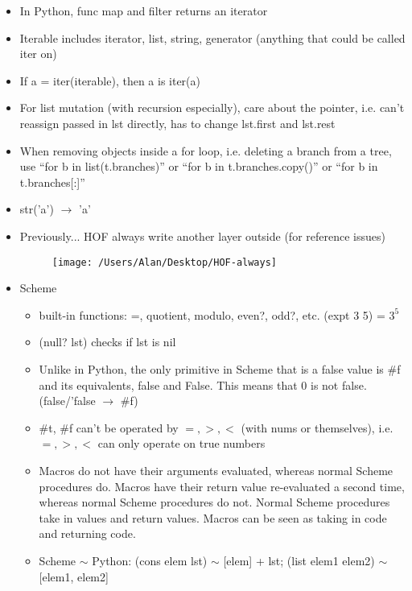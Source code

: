 \documentclass{article}
\begin{document}
\begin{itemize}
	\item In Python, func map and filter returns an {\color{red} iterator}
	\item Iterable includes iterator, list, string, generator (anything that could be called iter on)
	\item If a = iter(iterable), then a is iter(a)
	\item For list mutation (with recursion especially), care about the pointer, i.e. can't reassign passed in lst directly, has to change lst.first and lst.rest
	\item When removing objects inside a for loop, i.e. deleting a branch from a tree, use ``for b in list(t.branches)'' or ``for b in t.branches.copy()'' or ``for b in t.branches[:]''
	\item str('a') $\longrightarrow$ 'a'
	\item Previously... HOF always write another layer outside (for reference issues)
	\begin{figure} [h!]
	\begin{center}
		\texttt{[image: /Users/Alan/Desktop/HOF-always]}
		\label{fig}
	\end{center}
	\end{figure}
	\item Scheme
	\begin{itemize}
		\item built-in functions: =, quotient, modulo, even?, odd?, etc. (expt 3 5) = $3^5$
		\item (null? lst) checks if lst is nil
		\item Unlike in Python, the only primitive in Scheme that is a false value is \#f and its equivalents, false and False. This means that 0 is not false. (false/'false $\longrightarrow$ \#f)
		\item \#t, \#f can't be operated by $=, >, <$ (with nums or themselves), i.e. $=, >, <$ can only operate on true numbers
		\item Macros do not have their arguments evaluated, whereas normal Scheme procedures do. Macros have their return value re-evaluated a second time, whereas normal Scheme procedures do not. Normal Scheme procedures take in values and return values. Macros can be seen as taking in code and returning code.
		\item Scheme $\sim$ Python: (cons elem lst) $\sim$ [elem] + lst; (list elem1 elem2) $\sim$ [elem1, elem2]
	\end{itemize}


\end{itemize}
\end{document}

